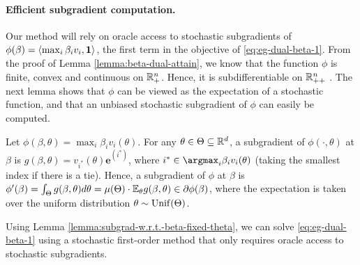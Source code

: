 \paragraph{Efficient subgradient computation.} %
Our method will rely on oracle access to stochastic subgradients of $\phi(\beta) = \langle \max_i \beta_i v_i, \mathbf{1} \rangle$, the first term in the objective of \eqref{eq:eg-dual-beta-1}.
From the proof of Lemma \ref{lemma:beta-dual-attain}, we know that the function $\phi$ is finite, convex and continuous on $\mathbb{R}_+^n$. 
Hence, it is subdifferentiable on $\mathbb{R}^n_{++}$ \cite[Proposition C.6.5]{ben2019lectures}. 
The next lemma shows that  $\phi$ can be viewed as the expectation of a stochastic function, and that an unbiased stochastic subgradient of $\phi$ can easily be computed. 
\begin{lemma}
	Let $\phi(\beta, \theta) = \max_i \beta_i v_i(\theta)$. For any $\theta\in \Theta \subseteq \mathbb{R}^d$, a subgradient of $\phi(\cdot, \theta)$ at $\beta$ is $ g(\beta, \theta) = v_{i^*}(\theta) \mathbf{e}^{(i^*)}$, where $i^* \in \argmax_i \beta_i v_i(\theta)$ (taking the smallest index if there is a tie). Hence, a subgradient of $\phi$ at $\beta$ is $\phi'(\beta) = \int_{\Theta} g(\beta, \theta) d\theta = \mu(\Theta) \cdot \mathbb{E}_\theta g(\beta, \theta) \in \partial \phi(\beta)$, where the expectation is taken over the uniform distribution $\theta\sim {\rm Unif}(\Theta)$.  
	\label{lemma:subgrad-w.r.t.-beta-fixed-theta}
\end{lemma}
Using Lemma \ref{lemma:subgrad-w.r.t.-beta-fixed-theta}, we can solve \eqref{eq:eg-dual-beta-1} using a stochastic first-order method that only requires oracle access to stochastic subgradients.
%
